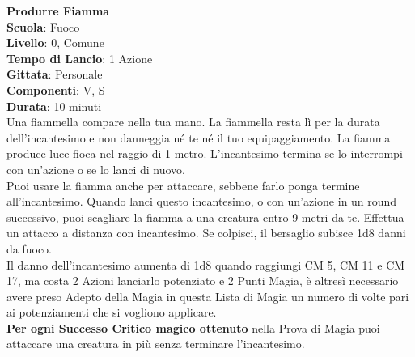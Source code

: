\begin{multicols}{2}
\medskip\textbf{Produrre Fiamma}\\
\textbf{Scuola}: Fuoco\\
\textbf{Livello}: 0, Comune\\
\textbf{Tempo di Lancio}: 1 Azione\\
\textbf{Gittata}: Personale\\
\textbf{Componenti}: V, S\\
\textbf{Durata}: 10 minuti\\
Una fiammella compare nella tua mano. La fiammella resta lì per la durata dell'incantesimo e non danneggia né te né il tuo equipaggiamento. La fiamma produce luce fioca nel raggio di 1 metro. L'incantesimo termina se lo interrompi con un'azione o se lo lanci di nuovo.\\
Puoi usare la fiamma anche per attaccare, sebbene farlo ponga termine all'incantesimo. Quando lanci questo incantesimo, o con un'azione in un round successivo, puoi scagliare la fiamma a una creatura entro 9 metri da te. Effettua un attacco a distanza con incantesimo. Se colpisci, il bersaglio subisce 1d8 danni da fuoco.\\
Il danno dell'incantesimo aumenta di 1d8 quando raggiungi CM 5, CM 11 e CM 17, ma costa 2 Azioni lanciarlo potenziato e 2 Punti Magia, è altresì necessario avere preso Adepto della Magia in questa Lista di Magia un numero di volte pari ai potenziamenti che si vogliono applicare.\\
\textbf{Per ogni Successo Critico magico ottenuto} nella Prova di Magia puoi attaccare una creatura in più senza terminare l'incantesimo.



\end{multicols}
